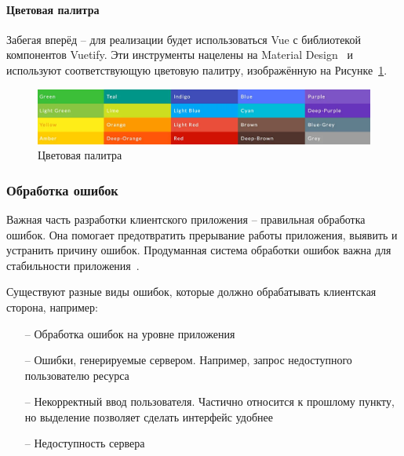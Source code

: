 \documentclass[a4paper,article]{article}
\begin{document}
\begin{sloppypar}
    \newpage
    
    \paragraph{Цветовая палитра}
    
    Забегая вперёд -- для реализации будет использоваться Vue с библиотекой компонентов Vuetify. Эти инструменты нацелены на Material Design~\cite{vuetify} и используют соответствующую цветовую палитру, изображённую на Рисунке~\ref{fig:colorscheme}.
    
    \begin{figure}[h]
        \centering
        \includegraphics[width=0.8\linewidth]{Цветовая палитра.png}
        \caption{\centering Цветовая палитра}
        \label{fig:colorscheme}
    \end{figure}
    
    \vspace{-1em}

    \subsubsection{Обработка ошибок}\label{Проектирование клиента. Обработка ошибок}

    Важная часть разработки клиентского приложения -- правильная обработка ошибок. Она помогает предотвратить прерывание работы приложения, выявить и устранить причину ошибок. Продуманная система обработки ошибок важна для стабильности приложения~\cite{vuejs}.

    Существуют разные виды ошибок, которые должно обрабатывать клиентская сторона, например:

    \begin{itemize}[nolistsep]
        \item[--] Обработка ошибок на уровне приложения
        \item[--] Ошибки, генерируемые сервером. Например, запрос недоступного пользователю ресурса
        \item[--] Некорректный ввод пользователя. Частично относится к прошлому пункту, но выделение позволяет сделать интерфейс удобнее
        \item[--] Недоступность сервера
    \end{itemize}


\end{sloppypar}
\end{document}
